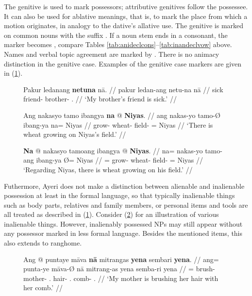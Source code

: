 The genitive is used to mark possessors; attributive genitives follow the
possessee. It can also be used for ablative meanings, that is, to mark the
place from which a motion originates, in analogy to the dative's allative use.
The genitive is marked on common nouns with the suffix . If a
noun stem ends in a consonant, the marker becomes , compare
Tables \ref{tab:anideclcons}--\ref{tab:inandeclvow} above. Names and verbal
topic agreement are marked by . There is no animacy distinction in
the genitive case. Examples of the genitive case markers are given in
(\ref{ex:genmarking}).

\begin{figure}[h]
\pex\label{ex:genmarking}
\a\begingl
	\gla Pakur ledanang \textbf{netuna} nā. //
	\glb pakur ledan-ang netu-na nā //
	\glc sick friend-\Aarg{} brother-\Gen{} \Fsg{}.\Gen{} //
	\glft `My brother's friend is sick.' //
\endgl


\a\begingl
	\gla Ang nakasyo tamo ibangya \textbf{na} @ \textbf{Niyas}. //
	\glb ang nakas-yo tamo-Ø ibang-ya na= Niyas //
	\glc \AgtT{} grow-\TsgN{} wheat-\Top{} field-\Loc{} \Gen{}= Niyas //
	\glft `There is wheat growing on Niyas's field.' //
\endgl

\a\begingl
	\gla \textbf{Na} @ nakasyo tamoang ibangya {} @ \textbf{Niyas}. //
	\glb na= nakas-yo tamo-ang ibang-ya Ø= Niyas //
	\glc \GenT{}= grow-\TsgN{} wheat-\Aarg{} field-\Loc{} \Top{}= Niyas //
	\glft `Regarding Niyas, there is wheat growing on his field.' //
\endgl
\xe
\end{figure}

Futhermore, Ayeri does not make a distinction between alienable and inalienable
possession at least in the formal language, so that typically inalienable
things such as body parts, relatives and family members, or personal items and
tools are all treated as described in (\ref{ex:genmarking}). Consider
(\ref{ex:inalposs}) for an illustration of various inalienable things. However,
inalienably possessed NPs may still appear without any possessor marked in less
formal language. Besides the mentioned items, this also extends to 
{rang}{home}.

\begin{figure}
\ex\label{ex:inalposs}
\begingl
	\gla Ang @ puntaye māva \textbf{nā} mitrangas \textbf{yena} sembari 
		\textbf{yena}. //
	\glb ang= punta-ye māva-Ø nā mitrang-as yena semba-ri 
		yena //
	\glc \AgtT{}= brush-\TsgF{} mother-\Top{} \Fsg{}.\Gen{} hair-\Parg{} 
		\TsgF{}.\Gen{} comb-\Ins{} \TsgF{}.\Gen{} //
	\glft `My mother is brushing her hair with her comb.' //
\endgl\xe
\end{figure}

